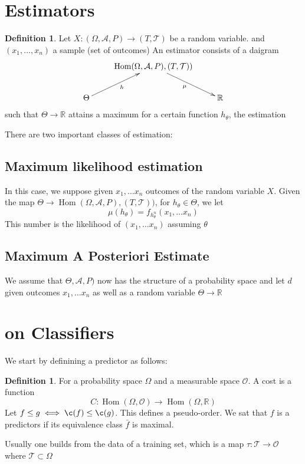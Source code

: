 \documentclass{book}
\theoremstyle{plain}
\theoremstyle{definition}
\newtheorem{definition}[corollary]{Definition}
\renewcommand{\d}[1]{\mathbb{#1}}
\DeclareMathOperator{\Hom}{Hom}
\newcommand{\mor}{\longrightarrow}
\renewcommand{\r}[1]{\mathcal{#1}}
\renewcommand{\r}[1]{\mathcal{#1}}
\begin{document}
\section{Estimators}

\begin{definition}
Let $X:(\Omega,\r{A},P)\mor (T,\r{T})$ be a random variable. and $(x_1,\ldots , x_n)$ a sample (set of outcomes) An estimator consists of a daigram
\begin{displaymath}
\xymatrix{
&  \Hom(\Omega,\r{A},P), (T,\r{T}))\ar[dr]_\mu\\
\Theta\ar[ur]_h & & \d{R}
}	
\end{displaymath}
such that $\Theta\mor \d{R}$ attains a maximum for a certain function $h_\theta$, the estimation
\end{definition}


There are two important classes of estimation:

\subsection{Maximum likelihood estimation}
 In this case, we suppose given $x_1,\dots x_n$ outcomes of the random variable $X$. Given the map $\Theta \mor \Hom(\Omega,\r{A},P), (T,\r{T}))$, for $h_\theta \in \Theta$, we let \[\mu(h_\theta)=f_{h_\theta^n}(x_1,\ldots x_n)\]
 This number is the likelihood of $(x_1,\ldots x_n)$ assuming $\theta$
 
 \subsection{Maximum A Posteriori Estimate}
 We assume that $\Theta,\r{A},P)$ now has the structure of a probability space and let $ d$ given outcomes $x_1,\ldots x_n$ as well as a random variable $\Theta\mor \d{R}$
\section{on Classifiers}

We start by definining a predictor as follows:
\begin{definition}
For a probability space $\Omega$ and a measurable space $\r{O}$. A cost is a function
\[
C:\Hom(\Omega,\r{O}) \mor \Hom(\Omega,\d{R})
\]	
Let $f\le g \iff \c(f)\le \c(g)$. This defines a pseudo-order. We sat that $f$ is a predictors if its equivalence class $\bar{f}$ is maximal.
\end{definition}

Usually one builds from the data of a training set, which is a map $\tau: \r{T}\mor \r{O}$ where $\r{T}\subset \Omega$
\end{document}
